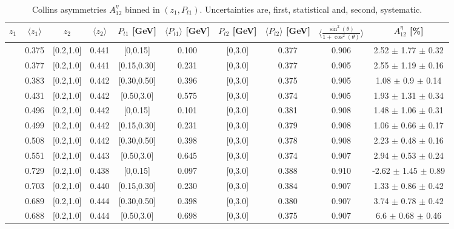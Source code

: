 \documentclass[aps,prX,preprint,groupedaddress,linenumbers]{revtex4-1}
\begin{document}
\begin{table}[H]
\centering
\begin{tabular}{|c| c| c| c| c| c| c| c| c| c|}
\hline
$z_1$& $\langle  z_{1}  \rangle$ & $z_2$ & $\langle  z_{2}\rangle$& $P_{t1}$ [GeV] & $\langle  P_{t1} \rangle$ [GeV] & $P_{t2}$ [GeV] &  $\langle P_{t2}\rangle$ [GeV]  &$\langle\frac{\sin^2(\theta)}{1+\cos^2(\theta)}\rangle$& $A_{12}^{\eta}$ [\%]   \\ \hline
[0.3,0.5]	&	0.375	&	[0.2,1.0]	&	0.441	&	[0,0.15]	&	0.100	&	[0,3.0]	&	0.377	&	0.906	&  2.52  $\pm$ 1.77  $\pm$ 0.32     \\ \hline
[0.3,0.5]	&	0.377	&	[0.2,1.0]	&	0.441	&	[0.15,0.30]	&	0.231	&	[0,3.0]	&	0.377	&	0.905	&  2.55  $\pm$ 1.19  $\pm$ 0.16     \\ \hline
[0.3,0.5]	&	0.383	&	[0.2,1.0]	&	0.442	&	[0.30,0.50]	&	0.396	&	[0,3.0]	&	0.375	&	0.905	&  1.08  $\pm$ 0.9  $\pm$ 0.14      \\ \hline
[0.3,0.5]	&	0.431	&	[0.2,1.0]	&	0.442	&	[0.50,3.0]	&	0.575	&	[0,3.0]	&	0.374	&	0.905	&  1.93  $\pm$ 1.31  $\pm$ 0.34     \\ \hline
\hline
[0.5,0.7]	&	0.496	&	[0.2,1.0]	&	0.442	&	[0,0.15]	&	0.101	&	[0,3.0]	&	0.381	&	0.908	&  1.48  $\pm$ 1.06  $\pm$ 0.31     \\ \hline
[0.5,0.7]	&	0.499	&	[0.2,1.0]	&	0.442	&	[0.15,0.30]	&	0.231	&	[0,3.0]	&	0.379	&	0.908	&  1.06  $\pm$ 0.66  $\pm$ 0.17     \\ \hline
[0.5,0.7]	&	0.508	&	[0.2,1.0]	&	0.442	&	[0.30,0.50]	&	0.398	&	[0,3.0]	&	0.378	&	0.908	&  2.23  $\pm$ 0.48  $\pm$ 0.16     \\ \hline
[0.5,0.7]	&	0.551	&	[0.2,1.0]	&	0.443	&	[0.50,3.0]	&	0.645	&	[0,3.0]	&	0.374	&	0.907	&  2.94  $\pm$ 0.53  $\pm$ 0.24     \\ \hline
\hline
[0.7,1.0]	&	0.729	&	[0.2,1.0]	&	0.438	&	[0,0.15]	&	0.097	&	[0,3.0]	&	0.388	&	0.910	&  -2.62  $\pm$ 1.45  $\pm$ 0.89    \\ \hline
[0.7,1.0]	&	0.703	&	[0.2,1.0]	&	0.440	&	[0.15,0.30]	&	0.230	&	[0,3.0]	&	0.384	&	0.907	&  1.33  $\pm$ 0.86  $\pm$ 0.42     \\ \hline
[0.7,1.0]	&	0.689	&	[0.2,1.0]	&	0.444	&	[0.30,0.50]	&	0.398	&	[0,3.0]	&	0.380	&	0.907	&  3.74  $\pm$ 0.78  $\pm$ 0.42     \\ \hline
[0.7,1.0]	&	0.688	&	[0.2,1.0]	&	0.444	&	[0.50,3.0]	&	0.698	&	[0,3.0]	&	0.375	&	0.907	&  6.6  $\pm$ 0.68  $\pm$ 0.46    	\\ \hline
\end{tabular}
\caption[Collins asymmetries $A_{12}^{\eta}$ binned in $(z_{1},P_{t1})$]{Collins asymmetries $A_{12}^{\eta}$ binned in $(z_{1},P_{t1})$. Uncertainties are, first, statistical and, second, systematic.}
\label{tab:finaletaptbins}
\end{table}
\end{document}
